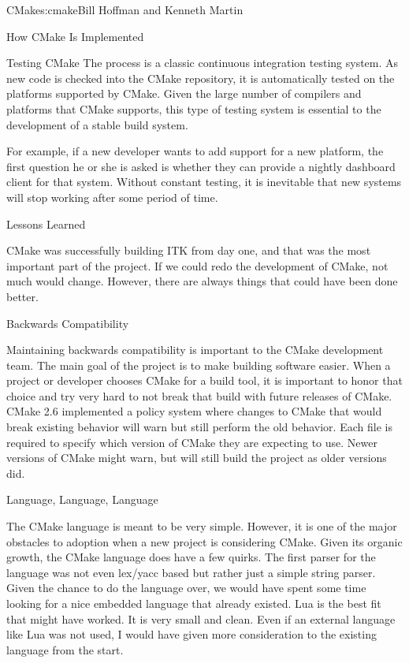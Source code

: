 \begin{aosachapter}{CMake}{s:cmake}{Bill Hoffman and Kenneth Martin}
\begin{aosasect1}{How CMake Is Implemented}
\begin{aosasect2}{Testing CMake}
The process is a classic continuous integration testing system. As new
code is checked into the CMake repository, it is automatically tested
on the platforms supported by CMake. Given the large number of
compilers and platforms that CMake supports, this type of testing
system is essential to the development of a stable build system.

For example, if a new developer wants to add support for a new
platform, the first question he or she is asked is whether they can
provide a nightly dashboard client for that system. Without constant
testing, it is inevitable that new systems will stop working after
some period of time.

\end{aosasect2}

\end{aosasect1}

\begin{aosasect1}{Lessons Learned}

CMake was successfully building ITK from day one, and that was the
most important part of the project. If we could redo the development
of CMake, not much would change. However, there are always things that
could have been done better.

\begin{aosasect2}{Backwards Compatibility}

Maintaining backwards compatibility is important to the CMake
development team. The main goal of the project is to make building
software easier. When a project or developer chooses CMake for a build
tool, it is important to honor that choice and try very hard to not
break that build with future releases of CMake. CMake 2.6 implemented
a policy system where changes to CMake that would break existing
behavior will warn but still perform the old behavior. Each
 file is required to specify which version of
CMake they are expecting to use.  Newer versions of CMake might warn,
but will still build the project as older versions did.

\end{aosasect2}

\begin{aosasect2}{Language, Language, Language}

The CMake language is meant to be very simple. However, it is one of
the major obstacles to adoption when a new project is considering
CMake. Given its organic growth, the CMake language does have a few
quirks. The first parser for the language was not even lex/yacc based
but rather just a simple string parser. Given the chance to do the
language over, we would have spent some time looking for a nice
embedded language that already existed. Lua is the best fit that might
have worked. It is very small and clean. Even if an external language
like Lua was not used, I would have given more consideration to the
existing language from the start.


\end{aosasect2}
\end{aosasect1}
\end{aosachapter}
